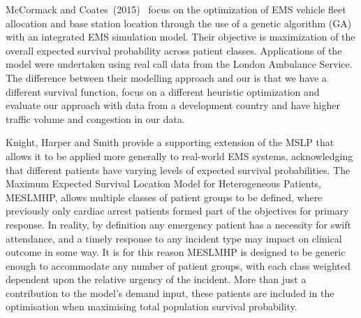 \documentclass[preprint,12pt]{elsarticle}
\begin{document}
McCormack and Coates~(2015)~\cite{MCormack2015} focus on the optimization of EMS vehicle fleet allocation and base station location through the use of a genetic algorithm (GA) with an integrated EMS simulation model. Their objective is maximization of the overall expected survival probability across patient classes. Applications of the model were undertaken using real call data from the London Ambulance Service. The difference between their modelling approach and our is that we have a different survival function, focus on a different heuristic optimization and evaluate our approach with data from a development country and have higher traffic volume and congestion in our data. 

Knight, Harper and Smith \cite{Knight2012918} provide a supporting extension of the MSLP that allows it to be applied more generally to real-world EMS systems, acknowledging that different patients have varying levels of expected survival probabilities.  The Maximum Expected Survival Location Model for Heterogeneous Patients, MESLMHP, allows multiple classes of patient groups to be defined, where previously only cardiac arrest patients formed part of the objectives for primary response.  In reality, by definition any emergency patient has a necessity for swift attendance, and a timely response to any incident type may impact on clinical outcome in some way. It is for this reason MESLMHP is designed to be generic enough to accommodate any number of patient groups, with each class weighted dependent upon the relative urgency of the incident.  More than just a contribution to the model’s demand input, these patients are included in the optimisation when maximising total population survival probability.

\end{document}
